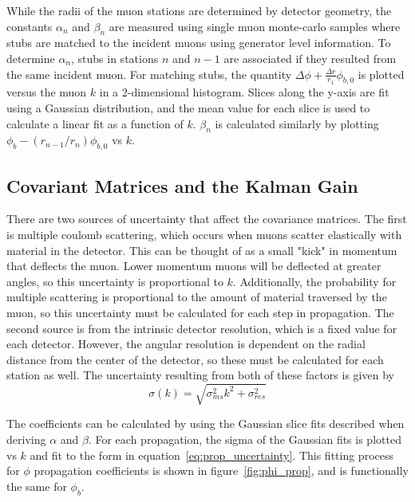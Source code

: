 While the radii of the muon stations are determined by detector geometry, the constants $\alpha_n$ and $\beta_n$ are measured using single muon monte-carlo samples where stubs are matched to the incident muons using generator level information. To determine $\alpha_n$, stubs in stations $n$ and $n-1$ are associated if they resulted from the same incident muon. For matching stubs, the quantity $\Delta\phi+\frac{\Delta r}{r_1}\phi_{b,0}$ is plotted versus the muon $k$ in a 2-dimensional histogram. Slices along the y-axis are fit using a Gaussian distribution, and the mean value for each slice is used to calculate a linear fit as a function of $k$. $\beta_n$ is calculated similarly by plotting $\phi_b-\left(r_{n-1}/r_n\right)\phi_{b,0}$ vs $k$.

\subsection{Covariant Matrices and the Kalman Gain} \label{sec:kbmtf_cov}
There are two sources of uncertainty that affect the covariance matrices. The first is multiple coulomb scattering, which occurs when muons scatter elastically with material in the detector. This can be thought of as a small "kick" in momentum that deflects the muon. Lower momentum muons will be deflected at greater angles, so this uncertainty is proportional to $k$. Additionally, the probability for multiple scattering is proportional to the amount of material traversed by the muon, so this uncertainty must be calculated for each step in propagation. The second source is from the intrinsic detector resolution, which is a fixed value for each detector. However, the angular resolution is dependent on the radial distance from the center of the detector, so these must be calculated for each station as well. The uncertainty resulting from both of these factors is given by
\begin{equation}
	\label{eq:prop_uncertainty}
	\sigma(k)=\sqrt{\sigma_{ms}^2k^2+\sigma_{res}^2}
\end{equation}

The coefficients can be calculated by using the Gaussian slice fits described when deriving $\alpha$ and $\beta$. For each propagation, the sigma of the Gaussian fits is plotted vs $k$ and fit to the form in equation~\ref{eq:prop_uncertainty}. This fitting process for $\phi$ propagation coefficients is shown in figure~\ref{fig:phi_prop}, and is functionally the same for $\phi_b$.

